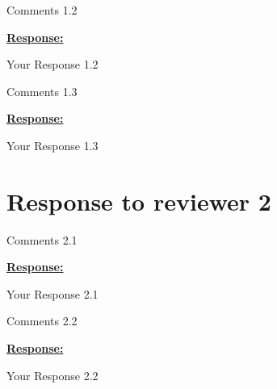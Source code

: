 \documentclass{article}
\begin{document}
\vspace{0.3cm}


\begin{cmt}{}{}

Comments 1.2

\end{cmt}
\vspace{0.1cm}
\noindent
\underline{\textbf{Response:}}
\vspace{0.2cm}

Your Response 1.2

\vspace{0.3cm}


\begin{cmt}{}{}

Comments 1.3

\end{cmt}
\vspace{0.1cm}
\noindent
\underline{\textbf{Response:}}
\vspace{0.2cm}

Your Response 1.3

\vspace{0.3cm}



\newpage
\section{Response to reviewer 2}

\begin{cmt}{}{}

Comments 2.1

\end{cmt}
\vspace{0.1cm}
\noindent
\underline{\textbf{Response:}}
\vspace{0.2cm}

Your Response 2.1

\vspace{0.3cm}


\begin{cmt}{}{}

Comments 2.2

\end{cmt}
\vspace{0.1cm}
\noindent
\underline{\textbf{Response:}}
\vspace{0.2cm}

Your Response 2.2
\end{document}
